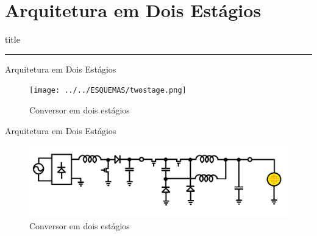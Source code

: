 \documentclass{beamer}
\begin{document}
\section{Arquitetura em Dois Estágios}
\begin{frame}[plain]
	\vfill
	\centering
	\begin{beamercolorbox}[sep=8pt,center,shadow=true,rounded=true]{title}
		\insertsectionhead\par%
		\color{oxfordblue}\noindent\rule{10cm}{1pt}
	\end{beamercolorbox}
	\vfill
\end{frame}
\begin{frame}{Arquitetura em Dois Estágios}

\begin{figure}[htb]
	\centering
		\texttt{[image: ../../ESQUEMAS/twostage.png]}
		\caption{Conversor em dois estágios}
\end{figure}
	
\end{frame}
\begin{frame}{Arquitetura em Dois Estágios}
	
\begin{figure}[htb]
	\centering
	\includegraphics[width=12cm]{../../ESQUEMAS/BOOST_EDSCIBUCK.png}
	\caption{Conversor em dois estágios}
\end{figure}
	
\end{frame}
\end{document}
